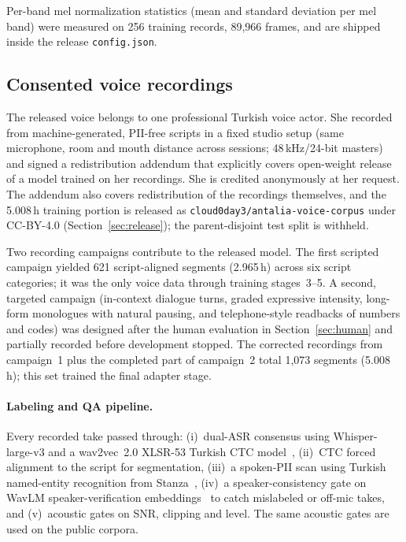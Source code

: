 \documentclass[10pt,twocolumn]{article}
\newcommand{\code}[1]{\texttt{#1}}
\begin{document}
Per-band mel normalization statistics (mean and standard deviation per mel band) were measured on 256 training records, 89,966 frames, and are shipped inside the release \code{config.json}.

\subsection{Consented voice recordings}
\label{sec:voice-data}

The released voice belongs to one professional Turkish voice actor. She recorded from machine-generated, PII-free scripts in a fixed studio setup (same microphone, room and mouth distance across sessions; 48\,kHz/24-bit masters) and signed a redistribution addendum that explicitly covers open-weight release of a model trained on her recordings. She is credited anonymously at her request. The addendum also covers redistribution of the recordings themselves, and the 5.008\,h training portion is released as \code{cloud0day3/antalia-voice-corpus} under CC-BY-4.0 (Section~\ref{sec:release}); the parent-disjoint test split is withheld.

Two recording campaigns contribute to the released model. The first scripted campaign yielded 621 script-aligned segments (2.965\,h) across six script categories; it was the only voice data through training stages~3--5. A second, targeted campaign (in-context dialogue turns, graded expressive intensity, long-form monologues with natural pausing, and telephone-style readbacks of numbers and codes) was designed after the human evaluation in Section~\ref{sec:human} and partially recorded before development stopped. The corrected recordings from campaign~1 plus the completed part of campaign~2 total 1,073 segments (5.008\,h); this set trained the final adapter stage.

\paragraph{Labeling and QA pipeline.} Every recorded take passed through: (i)~dual-ASR consensus using Whisper-large-v3 and a wav2vec~2.0 XLSR-53 Turkish CTC model~\citep{baevski2020wav2vec2}, (ii)~CTC forced alignment to the script for segmentation, (iii)~a spoken-PII scan using Turkish named-entity recognition from Stanza~\citep{qi2020stanza}, (iv)~a speaker-consistency gate on WavLM speaker-verification embeddings~\citep{chen2022wavlm} to catch mislabeled or off-mic takes, and (v)~acoustic gates on SNR, clipping and level. The same acoustic gates are used on the public corpora.
\end{document}
